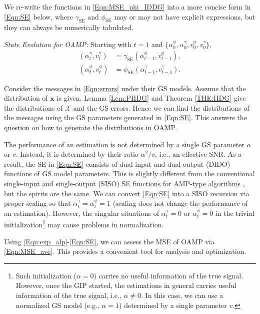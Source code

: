 \documentclass[journal]{IEEEtran}
\newcommand{\mr}{\mathrm}
\newcommand{\BS}{\begin{subequations}}
\newcommand{\ES}{\end{subequations}}
\renewcommand{\bf}{\bm}
\newcommand{\LL}[1]{\textcolor{black}{#1}}
\begin{document}
We re-write the functions in \eqref{Eqn:MSE_phi_IDDG} into a more concise form in \eqref{Eqn:SE} below, where $\gamma_{\mr{SE}}$ and $\phi_{\mr{SE}}$ may or may not have explicit expressions, but they can always be numerically tabulated.  	 

\textit{State Evolution for OAMP:}  Starting with $t=1$ and $\{\alpha_0^\phi, \alpha_0^\gamma, v_0^\phi, v_0^\gamma\}$,
\BS\label{Eqn:SE} \begin{align}
(\alpha_t^\gamma, v_t^\gamma)&= \gamma_{\mr{SE}}(\alpha_{t-1}^\phi, v_{t-1}^\phi),\\
(\alpha_t^\phi, v_t^\phi) &=\phi_{\mr{SE}}(\alpha_{t-1}^\gamma, v_{t-1}^\gamma). 
\end{align}\ES 
 
Consider the messages in \eqref{Eqn:errors} under their GS models. Assume that the distribution of $\bf{x}$ is given. Lemma \ref{Lem:PIIDG} and Theorem \ref{THE:IIDG} give the distributions of $\bf{\mathcal{X}}$ and the GS errors. Hence we can find the distributions of the messages using the GS parameters generated in \eqref{Eqn:SE}. This answers the question on how to generate the distributions in OAMP.

The performance of an estimation is not determined by a single GS parameter $\alpha$ or $v$. Instead, it is determined by their ratio $\alpha^2/v$, i.e., an effective SNR. As a result, the SE in \eqref{Eqn:SE} consists of dual-input and dual-output (DIDO) functions of GS model parameters. This is slightly different from the conventional single-input and single-output (SISO) SE functions for AMP-type algorithms \cite{Ma2016, Donoho2009}, but the spirits are the same. We can convert \eqref{Eqn:SE} into a SISO recursion via proper scaling so that $\alpha_{t}^{\!\gamma}= \alpha_{t}^{\!\phi}=1$ (scaling does not change the performance of an estimation). However, the singular situations of $\alpha_{t}^{\!\gamma}=0$  or $\alpha_{t}^{\!\phi}=0$ in the \LL{trivial} initialization\footnote{Such initialization ($\alpha=0$) carries no useful information of the true signal. However, once the GIP started, the estimations in general carries useful information of the true signal, i.e., $\alpha\neq 0$. In this case, we can use a normalized GS model (e.g., $\alpha=1$) determined by a single parameter $v$.} may cause problems in normalization.

Using \eqref{Eqn:exp_alp}-\eqref{Eqn:SE}, we can assess the MSE of OAMP via \eqref{Eqn:MSE_ave}. This provides a convenient tool for analysis and optimization. %
\end{document}
